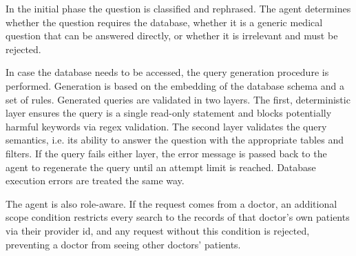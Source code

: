 In the initial phase the question is classified and rephrased. The agent determines whether the question requires the database, whether it is a generic medical question that can be answered directly, or whether it is irrelevant and must be rejected.

In case the database needs to be accessed, the query generation procedure is performed. Generation is based on the embedding of the database schema and a set of rules. Generated queries are validated in two layers. The first, deterministic layer ensures the query is a single read-only statement and blocks potentially harmful keywords via regex validation. The second layer validates the query semantics, i.e. its ability to answer the question with the appropriate tables and filters. If the query fails either layer, the error message is passed back to the agent to regenerate the query until an attempt limit is reached. Database execution errors are treated the same way.

The agent is also role-aware. If the request comes from a doctor, an additional scope condition restricts every search to the records of that doctor's own patients via their provider id, and any request without this condition is rejected, preventing a doctor from seeing other doctors' patients.